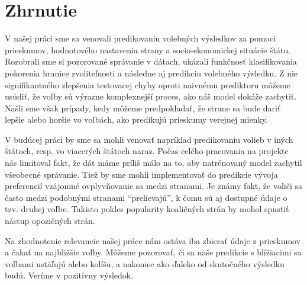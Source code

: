 \documentclass[main.tex]{subfiles}
\begin{document}
	
\section{Zhrnutie}	

V našej práci sme sa venovali predikovaniu volebných výsledkov za pomoci prieskumov, hodnotového nastavenia strany a socio-ekonomickej situácie štátu. Rozobrali sme si pozorované správanie v dátach, ukázali funkčnosť klasifikovania pokorenia hranice zvoliteľnosti a následne aj predikciu volebného výsledku. Z nie signifikantného zlepšenia testovacej chyby oproti naivnému prediktoru môžeme usúdiť, že voľby sú výrazne komplexnejší proces, ako náš model dokáže zachytiť. Našli sme však prípady, kedy môžeme predpokladať, že strane sa bude dariť lepšie alebo horšie vo voľbách, ako predikujú prieskumy verejnej mienky.

V budúcej práci by sme sa mohli venovať napríklad predikovaniu volieb v iných štátoch, resp. vo viacerých štátoch naraz. Počas celého pracovania na projekte nás limitoval fakt, že dát máme príliš málo na to, aby natrénovaný model zachytil všeobecné správanie. Tiež by sme mohli implementovať do predikcie vývoja preferencií vzájomné ovplyvňovanie sa medzi stranami. Je známy fakt, že voliči sa často medzi podobnými stranami \enquote{prelievajú}, k čomu sú aj dostupné údaje o tzv. druhej voľbe. Takisto pokles popularity koaličných strán by mohol spustiť nástup opozičných strán. 

Na zhodnotenie relevancie našej práce nám ostáva iba zbierať údaje z prieskumov a čakať na najbližšie voľby. Môžeme pozorovať, či sa naše predikcie s blížiacimi sa voľbami ustáľujú alebo kolíšu, a nakoniec ako ďaleko od skutočného výsledku budú. Veríme v pozitívny výsledok.
\end{document}
